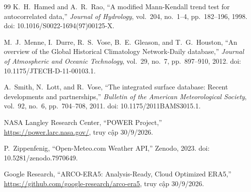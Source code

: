 \documentclass[12pt,a4paper]{report}
\begin{document}
\begin{thebibliography}{99}
 K.~H.~Hamed and A.~R.~Rao, ``A modified Mann-Kendall trend test for autocorrelated data,'' \emph{Journal of Hydrology}, vol.~204, no.~1--4, pp.~182--196, 1998. doi: 10.1016/S0022-1694(97)00125-X.

 M.~J.~Menne, I.~Durre, R.~S.~Vose, B.~E.~Gleason, and T.~G.~Houston, ``An overview of the Global Historical Climatology Network-Daily database,'' \emph{Journal of Atmospheric and Oceanic Technology}, vol.~29, no.~7, pp.~897--910, 2012. doi: 10.1175/JTECH-D-11-00103.1.

 A.~Smith, N.~Lott, and R.~Vose, ``The integrated surface database: Recent developments and partnerships,'' \emph{Bulletin of the American Meteorological Society}, vol.~92, no.~6, pp.~704--708, 2011. doi: 10.1175/2011BAMS3015.1.

 NASA Langley Research Center, ``POWER Project,'' \url{https://power.larc.nasa.gov/}, truy cập 30/9/2026.

 P.~Zippenfenig, ``Open-Meteo.com Weather API,'' Zenodo, 2023. doi: 10.5281/zenodo.7970649.

 Google Research, ``ARCO-ERA5: Analysis-Ready, Cloud Optimized ERA5,'' \url{https://github.com/google-research/arco-era5}, truy cập 30/9/2026.

\end{thebibliography}
\end{document}
